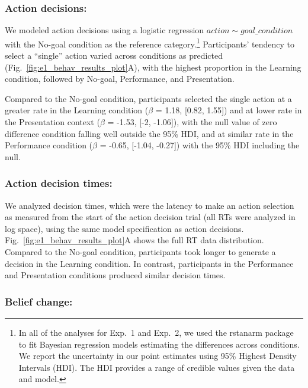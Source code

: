 \documentclass[10pt, letterpaper]{article}
\begin{document}
\subsubsection{Action decisions:}\label{action-decisions}

We modeled action decisions using a logistic regression
\texttt{$action \sim goal\_condition$} with the No-goal condition as the
reference
category.\footnote{In all of the analyses for Exp.\ 1 and Exp.\ 2, we used the {\selectfont rstanarm} package to fit Bayesian regression models estimating the differences across conditions. We report the uncertainty in our point estimates using 95\% Highest Density Intervals (HDI). The HDI provides a range of credible values given the data and model.}
Participants' tendency to select a ``single'' action varied across
conditions as predicted (Fig.~\ref{fig:e1_behav_results_plot}A), with
the highest proportion in the Learning condition, followed by No-goal,
Performance, and Presentation.

Compared to the No-goal condition, participants selected the single
action at a greater rate in the Learning condition (\(\beta\) = 1.18,
{[}0.82, 1.55{]}) and at lower rate in the Presentation context
(\(\beta\) = -1.53, {[}-2, -1.06{]}), with the null value of zero
difference condition falling well outside the 95\% HDI, and at similar
rate in the Performance condition (\(\beta\) = -0.65, {[}-1.04,
-0.27{]}) with the 95\% HDI including the null.

\subsubsection{Action decision times:}\label{action-decision-times}

We analyzed decision times, which were the latency to make an action
selection as measured from the start of the action decision trial (all
RTs were analyzed in log space), using the same model specification as
action decisions. Fig.~\ref{fig:e1_behav_results_plot}A shows the full
RT data distribution. Compared to the No-goal condition, participants
took longer to generate a decision in the Learning condition. In
contrast, participants in the Performance and Presentation conditions
produced similar decision times.

\subsubsection{Belief change:}\label{belief-change}
\end{document}
